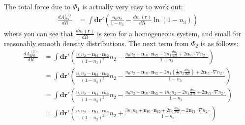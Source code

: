 \documentclass[letterpaper,twocolumn,amsmath,amssymb,prb]{revtex4-1}
\begin{document}
\begin{widetext}
The total force due to $\Phi_1$ is actually very easy to work out:
\begin{align}
  \frac{d A_{HS}^{(1)}}{d R} &=
  \int \mathbf{dr}' \left(\frac{n_0n_2}{1-n_3} - \frac{dn_0(\mathbf{r})}{dR}\ln(1-n_3) \right)
\end{align}
where you can see that $\frac{dn_0(\mathbf{r})}{dR}$ is zero for a
homogeneous system, and small for reasonably smooth density
distributions.  The next term from $\Phi_2$ is as follows:
\begin{align}
  \frac{d A_{HS}^{(2)}}{d R} &=
  \int \mathbf{dr}' \left(
    \frac{n_1 n_2 - \mathbf{n}_{V1} \cdot\mathbf{n}_{V2}}{(1-n_3)^2}
    n_2
    - \frac{n_0n_2 - \mathbf{n}_{V0} \cdot\mathbf{n}_{V2} - 2 n_1
      \frac{dn_2}{dR} + 2 \mathbf{n}_{V1} \cdot \nabla n_2 \cdot
    }{1-n_3}
  \right) \\
  &= \int \mathbf{dr}' \left(
    \frac{n_1 n_2 - \mathbf{n}_{V1} \cdot\mathbf{n}_{V2}}{(1-n_3)^2}
    n_2
    - \frac{n_0n_2 - \mathbf{n}_{V0} \cdot\mathbf{n}_{V2}
      - 2 n_1 \left(\frac2{R}n_2 \frac{dn_0}{dR}\right)
      + 2 \mathbf{n}_{V1} \cdot \nabla n_2 \cdot }{1-n_3}
  \right) \\
  &= \int \mathbf{dr}' \left(
    \frac{n_1 n_2 - \mathbf{n}_{V1} \cdot\mathbf{n}_{V2}}{(1-n_3)^2}
    n_2
    - \frac{n_0n_2 - \mathbf{n}_{V0} \cdot\mathbf{n}_{V2}
      - 4 n_0n_2 - 2 n_1\frac{dn_0}{dR}
      + 2 \mathbf{n}_{V1} \cdot \nabla n_2 \cdot }{1-n_3}
  \right) \\
  &= \int \mathbf{dr}' \left(
    \frac{n_1 n_2 - \mathbf{n}_{V1} \cdot\mathbf{n}_{V2}}{(1-n_3)^2}
    n_2
    + \frac{3n_0n_2 + \mathbf{n}_{V0} \cdot\mathbf{n}_{V2}
      + 2 n_1\frac{dn_0}{dR}
      - 2 \mathbf{n}_{V1} \cdot \nabla n_2 \cdot }{1-n_3}
  \right)
\end{align}


\end{widetext}
\end{document}
